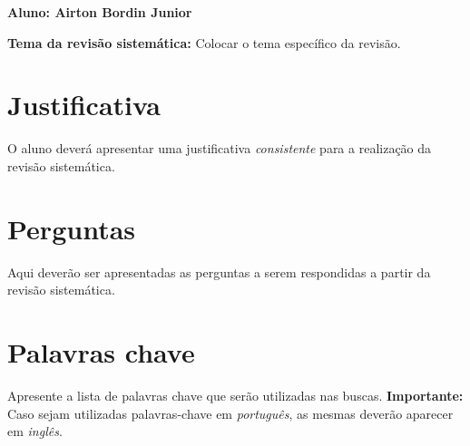 \documentclass[a4paper,11pt]{article}
\begin{document}
\selectfont



\begin{framed}
\begin{center}
\textbf{Aluno: Airton Bordin Junior}
\end{center}

\textbf{Tema da revisão sistemática:} Colocar o tema específico da revisão.

\end{framed}

\section{Justificativa}
O aluno deverá apresentar uma justificativa \emph{consistente} para a realização da revisão sistemática. 

\section{Perguntas}
Aqui deverão ser apresentadas as perguntas a serem respondidas a partir da revisão sistemática.

\section{Palavras chave}
Apresente a lista de palavras chave que serão utilizadas nas buscas. \textbf{Importante:}  Caso sejam utilizadas palavras-chave em \emph{português}, as mesmas deverão aparecer em \emph{inglês}.
\end{document}
